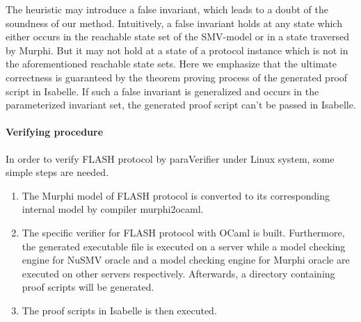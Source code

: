 \documentclass{llncs}
\newlength{\fminilength}
\newenvironment{fmini}[1][\linewidth]
  {\setlength{\fminilength}{#1\fboxsep-2\fboxrule}%
   \vspace{2ex}\noindent\begin{lrbox}{\fminibox}\begin{minipage}{\fminilength}%
   \mbox{ }\hfill\vspace{-2.5ex}}%
  {\end{minipage}\end{lrbox}\vspace{1ex}\hspace{0ex}%
   \framebox{\usebox{\fminibox}}}
\newenvironment{specification}
{\noindent\scriptsize
\tt\begin{fmini}\begin{tabbing}X\=X12345\=XXXX\=XXXX\=XXXX\=XXXX\=XXXX
\=\+\kill} {\end{tabbing}\normalfont\end{fmini}}
\newcommand{\bedt}[1]{{\color{black}#1}}
\newcommand{\forget}[1]{}
\begin{document}
 The \bedt{heuristic} may introduce a false invariant, which leads to a doubt of the soundness of our method.  Intuitively, a  false invariant holds at any   state which either occurs in the reachable state set of the SMV-model or in a state traversed by Murphi. But it may not hold at a state of a protocol instance which is not in the aforementioned reachable state sets. Here we emphasize that the ultimate correctness is guaranteed by the theorem proving process of the generated proof script in Isabelle. If such a false invariant is generalized and occurs in the parameterized invariant set, the generated proof script can't be passed in Isabelle.

\vspace{-10pt}
\paragraph{Verifying \bedt{procedure}}  In order to verify FLASH protocol by {\sf paraVerifier} under Linux system, some simple steps are needed.

\begin{enumerate}
\item The Murphi model of FLASH protocol is converted to its corresponding internal model by compiler {\sf murphi2ocaml}.
\item The specific verifier for FLASH protocol with OCaml is built. Furthermore, the generated executable file is  executed on a server while a model checking engine for NuSMV oracle and a model checking engine for Murphi oracle are executed on other servers respectively. Afterwards, a directory containing proof scripts will be generated.
\item The proof scripts in Isabelle is then executed.
\end{enumerate}

\forget{
Firstly, we convert Murphi model of FLASH protocol to its corresponding internal model by compiler {\sf murphi2ocaml} supposing that the compiler was put in path {\sf\$\{moc\}}.

\begin{specification}
  \$ python \$\{moc\}/gen.py -m flash.m > flash.ml
\end{specification}

Secondly, we build the specific verifier for FLASH protocol with OCaml and run the generated executable file supposing that address of the NuSMV oracle was {\sf vserv} and address of the Murphi oracle was {\sf mserv}. Afterwards, a directory named {\sf n\_flash} where proof scripts were put will be generated.

\begin{specification}
  corebuild flash.byte -pkg re2 -I src\\
  ./flash.byte -vh vserv -mh mserv
\end{specification}

Finally, we run the proof scripts in Isabelle.

\begin{specification}
  cd n\_flash\\
  ./run.sh
\end{specification}
}
\end{document}
